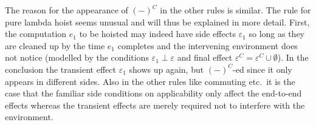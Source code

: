 \documentclass[nocopyrightspace,preprint]{sigplanconf}
\newcommand{\eff}{\varepsilon}
\begin{document}
The reason for the appearance of $(-)^C$ in the other rules is similar. The rule for pure lambda hoist seems unusual and will thus be explained in more detail. First, the computation $e_1$ to be hoisted may indeed have side effects $\eff_1$ so long as they are cleaned up by the time $e_1$ completes and the intervening environment does not notice (modelled by the conditions 
$\eff_1\perp\eff$ and final effect $\eff^C=\eff^C\cup\emptyset$). In the conclusion the transient effect $\eff_1$ shows up again, but $(-)^C$-ed since it only appears in different sides. Also in the other rules like commuting etc.\ 
it is the case that the familiar side conditions on applicability only affect the end-to-end effects whereas the transient effects are merely required not to interfere with the environment. 
\end{document}

